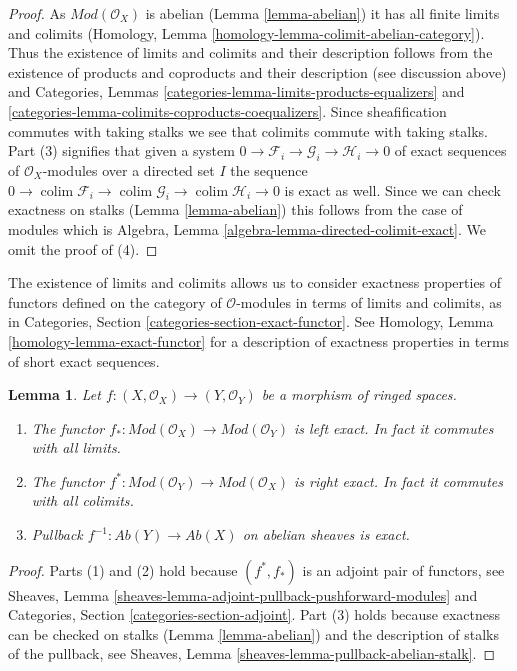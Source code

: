 \documentclass{stacks-project}
\theoremstyle{plain}
\newtheorem{lemma}[subsection]{Lemma}
\theoremstyle{definition}
\theoremstyle{remark}
\numberwithin{equation}{subsection}
\def\colim{\mathop{\mathrm{colim}}\nolimits}
\begin{document}
\begin{proof}
As $\textit{Mod}(\mathcal{O}_X)$ is abelian (Lemma \ref{lemma-abelian})
it has all finite limits and colimits
(Homology, Lemma \ref{homology-lemma-colimit-abelian-category}).
Thus the existence of limits and colimits and their description follows from
the existence of products and coproducts and their description
(see discussion above) and
Categories, Lemmas \ref{categories-lemma-limits-products-equalizers} and
\ref{categories-lemma-colimits-coproducts-coequalizers}.
Since sheafification commutes with taking stalks we see that
colimits commute with taking stalks. Part (3) signifies that given
a system $0 \to \mathcal{F}_i \to \mathcal{G}_i \to \mathcal{H}_i \to 0$
of exact sequences of $\mathcal{O}_X$-modules over a directed set $I$
the sequence $0 \to \colim \mathcal{F}_i \to \colim \mathcal{G}_i \to
\colim \mathcal{H}_i \to 0$ is exact as well. Since we can check
exactness on stalks (Lemma \ref{lemma-abelian}) this follows from the case
of modules which is
Algebra, Lemma \ref{algebra-lemma-directed-colimit-exact}.
We omit the proof of (4).
\end{proof}

\noindent
The existence of limits and colimits
allows us to consider exactness properties of
functors defined on the category of $\mathcal{O}$-modules
in terms of limits and colimits, as in
Categories, Section \ref{categories-section-exact-functor}.
See Homology, Lemma \ref{homology-lemma-exact-functor} for a
description of exactness
properties in terms of short exact sequences.

\begin{lemma}
\label{lemma-exactness-pushforward-pullback}
Let $f : (X, \mathcal{O}_X) \to (Y, \mathcal{O}_Y)$
be a morphism of ringed spaces.
\begin{enumerate}
\item The functor
$f_* : \textit{Mod}(\mathcal{O}_X) \to \textit{Mod}(\mathcal{O}_Y)$
is left exact. In fact it commutes with all limits.
\item The functor
$f^* : \textit{Mod}(\mathcal{O}_Y) \to \textit{Mod}(\mathcal{O}_X)$
is right exact. In fact it commutes with all colimits.
\item Pullback $f^{-1} : \textit{Ab}(Y) \to \textit{Ab}(X)$
on abelian sheaves is exact.
\end{enumerate}
\end{lemma}

\begin{proof}
Parts (1) and (2) hold because $(f^*, f_*)$ is an adjoint pair
of functors, see
Sheaves, Lemma \ref{sheaves-lemma-adjoint-pullback-pushforward-modules}
and
Categories, Section \ref{categories-section-adjoint}.
Part (3) holds because exactness can be checked on stalks
(Lemma \ref{lemma-abelian})
and the description of stalks of the pullback, see
Sheaves, Lemma \ref{sheaves-lemma-pullback-abelian-stalk}.
\end{proof}
\end{document}
